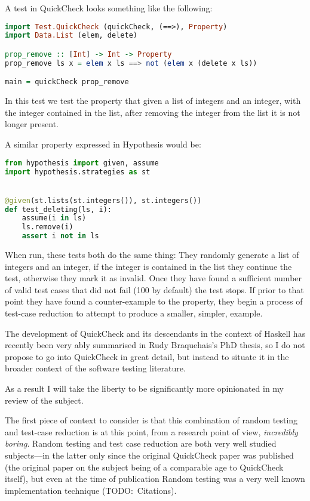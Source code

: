 A test in QuickCheck looks something like the following:

\begin{lstlisting}[language=Haskell]
import Test.QuickCheck (quickCheck, (==>), Property)
import Data.List (elem, delete)

prop_remove :: [Int] -> Int -> Property
prop_remove ls x = elem x ls ==> not (elem x (delete x ls))

main = quickCheck prop_remove
\end{lstlisting}

In this test we test the property that given a list of integers and an integer,
with the integer contained in the list,
after removing the integer from the list it is not longer present.

A similar property expressed in Hypothesis would be:

\begin{lstlisting}[language=Python]
from hypothesis import given, assume
import hypothesis.strategies as st


@given(st.lists(st.integers()), st.integers())
def test_deleting(ls, i):
    assume(i in ls)
    ls.remove(i)
    assert i not in ls
\end{lstlisting}

When run, these tests both do the same thing:
They randomly generate a list of integers and an integer,
if the integer is contained in the list they continue the test,
otherwise they mark it as invalid.
Once they have found a sufficient number of valid test cases that did not fail (100 by default) the test stops.
If prior to that point they have found a counter-example to the property,
they begin a process of test-case reduction to attempt to produce a smaller, simpler, example.

The development of QuickCheck and its descendants in the context of Haskell has recently been very ably summarised in Rudy Braquehais's PhD thesis\cite{matela2017tools},
so I do not propose to go into QuickCheck in great detail,
but instead to situate it in the broader context of the software testing literature.

As a result I will take the liberty to be significantly more opinionated in my review of the subject.

The first piece of context to consider is that this combination of random testing and test-case reduction is at this point,
from a research point of view,
\emph{incredibly boring}.
Random testing and test case reduction are both very well studied subjects---in
the latter only since the original QuickCheck paper was published
(the original paper on the subject being of a comparable age to QuickCheck itself\cite{DBLP:conf/issta/HildebrandtZ00}),
but even at the time of publication Random testing was a very well known implementation technique (TODO:\ Citations).


